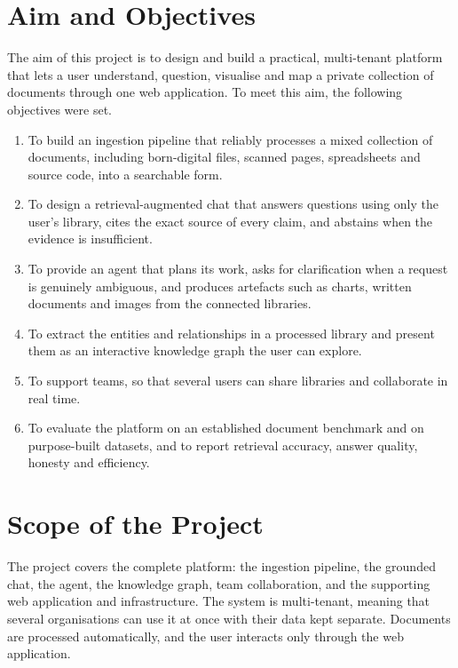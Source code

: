 \section{Aim and Objectives}

The aim of this project is to design and build a practical, multi-tenant platform
that lets a user understand, question, visualise and map a private collection of
documents through one web application. To meet this aim, the following objectives
were set.

\begin{enumerate}[leftmargin=*,itemsep=2pt]
  \item To build an ingestion pipeline that reliably processes a mixed
        collection of documents, including born-digital files, scanned pages,
        spreadsheets and source code, into a searchable form.
  \item To design a retrieval-augmented chat that answers questions using only
        the user's library, cites the exact source of every claim, and abstains
        when the evidence is insufficient.
  \item To provide an agent that plans its work, asks for clarification when a
        request is genuinely ambiguous, and produces artefacts such as charts,
        written documents and images from the connected libraries.
  \item To extract the entities and relationships in a processed library and
        present them as an interactive knowledge graph the user can explore.
  \item To support teams, so that several users can share libraries and
        collaborate in real time.
  \item To evaluate the platform on an established document benchmark and on
        purpose-built datasets, and to report retrieval accuracy, answer
        quality, honesty and efficiency.
\end{enumerate}

\section{Scope of the Project}

The project covers the complete platform: the ingestion pipeline, the grounded
chat, the agent, the knowledge graph, team collaboration, and the supporting web
application and infrastructure. The system is multi-tenant, meaning that several
organisations can use it at once with their data kept separate. Documents are
processed automatically, and the user interacts only through the web
application.

